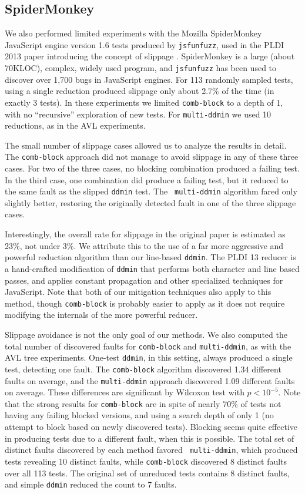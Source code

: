 \subsection{SpiderMonkey}

We also performed limited experiments with the Mozilla
SpiderMonkey JavaScript engine version 1.6 tests produced by {\tt jsfunfuzz}, used in the PLDI 2013 paper introducing
the concept of slippage \cite{PLDI13}.  SpiderMonkey is a large (about
70KLOC), complex, widely used program, and {\tt jsfunfuzz}
\cite{jsfunfuzz} has been used to discover over 1,700 bugs in
JavaScript engines.  For 113 randomly sampled
tests, using a single reduction produced slippage only about 2.7\% of the
time (in exactly 3 tests).  In these experiments we limited
{\tt comb-block} to a depth of 1, with no ``recursive'' exploration of
new tests.  For {\tt multi-ddmin} we used 10 reductions, as in the AVL experiments.

The small number of slippage cases
allowed us to analyze the results in detail.  The {\tt comb-block} approach did
not manage to avoid slippage in any of these three cases.  For two
of the three cases, no blocking combination produced a failing test.
In the third case, one combination did produce a failing test, but it
reduced to the same fault as the slipped {\tt ddmin} test.  The {\tt
  multi-ddmin} algorithm fared only slightly better, restoring the
originally detected fault in one of the three slippage cases.

Interestingly, the overall rate for slippage in the original paper is
estimated as 23\%, not under 3\%.  We attribute this to the use of a
far more aggressive and powerful reduction algorithm than our
line-based {\tt ddmin}.  The PLDI 13 reducer is a hand-crafted
modification of {\tt ddmin} that performs both character and line
based passes, and applies constant propagation and other specialized
techniques for JavaScript.  Note that both of our mitigation
techniques also apply to this method, though {\tt comb-block} is
probably easier to apply as it does not require modifying the internals of the
more powerful reducer.

Slippage avoidance is not the only goal of our methods.  We also computed the total number of discovered faults for
{\tt comb-block} and {\tt multi-ddmin}, as with the AVL tree
experiments.  One-test {\tt ddmin}, in this setting, always produced a
single test, detecting one fault.  The {\tt comb-block} algorithm
discovered 1.34 different faults on average, and the {\tt multi-ddmin}
approach discovered 1.09 different faults on average.  These
differences are significant by Wilcoxon test with $p < 10^{-5}$.  Note
that the strong results for {\tt comb-block} are in spite of nearly
70\% of tests not having any failing blocked versions, and using a
search depth of only 1 (no attempt to block based on newly discovered
tests).  Blocking seems quite effective in producing tests due to a
different fault, when this is possible.  The total set
of distinct faults discovered by each method favored {\tt
  multi-ddmin}, which produced tests revealing 10 distinct faults,
while {\tt comb-block} discovered 8 distinct faults over all 113
tests.  The original set of unreduced tests contains 8 distinct
faults, and simple {\tt ddmin} reduced the count to 7 faults.

